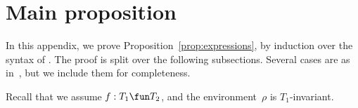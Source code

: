 \section{Main proposition}
\label{sec:proof}


In this appendix, we prove Proposition~\ref{prop:expressions}, by induction
over the syntax of \CSPm.  The proof is split over the following subsections.
Several cases are as in~\cite{symmetry-TR}, but we include them for
completeness.

Recall that we assume $f: T_1 \fun T_2$, and the environment~$\rho$ is
$T_1$-invariant. 


